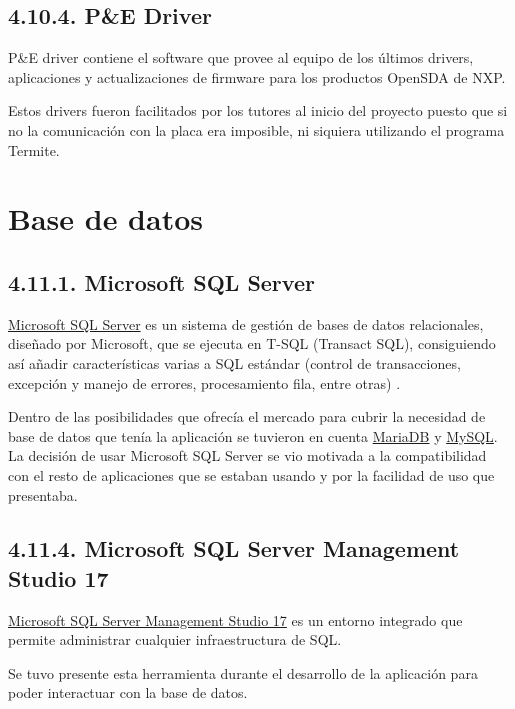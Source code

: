 \subsection{4.10.4. P\&E Driver}

P\&E driver contiene el software que provee al equipo de los últimos drivers, aplicaciones y actualizaciones de firmware para los productos OpenSDA de NXP.

Estos drivers fueron facilitados por los tutores al inicio del proyecto puesto que si no la comunicación con la placa era imposible, ni siquiera utilizando el programa Termite.

\section{Base de datos}

\subsection{4.11.1. Microsoft SQL Server}

\href{https://www.microsoft.com/es-es/sql-server/sql-server-2017}{Microsoft SQL Server} es un sistema de gestión de bases de datos relacionales, diseñado por Microsoft, que se ejecuta en T-SQL (Transact SQL), consiguiendo así añadir características varias a SQL estándar (control de transacciones, excepción y manejo de errores, procesamiento fila, entre otras) \cite{web:sqlServer}.

Dentro de las posibilidades que ofrecía el mercado para cubrir la necesidad de base de datos que tenía la aplicación se tuvieron en cuenta \href{https://mariadb.org/}{MariaDB} y \href{https://www.mysql.com/}{MySQL}. La decisión de usar Microsoft SQL Server se vio motivada a la compatibilidad con el resto de aplicaciones que se estaban usando y por la facilidad de uso que presentaba.

\subsection{4.11.4. Microsoft SQL Server Management Studio 17}

\href{https://docs.microsoft.com/es-es/sql/ssms/download-sql-server-management-studio-ssms?view=sql-server-2017}{Microsoft SQL Server Management Studio 17} es un entorno integrado que permite administrar cualquier infraestructura de SQL.

Se tuvo presente esta herramienta durante el desarrollo de la aplicación para poder interactuar con la base de datos.

